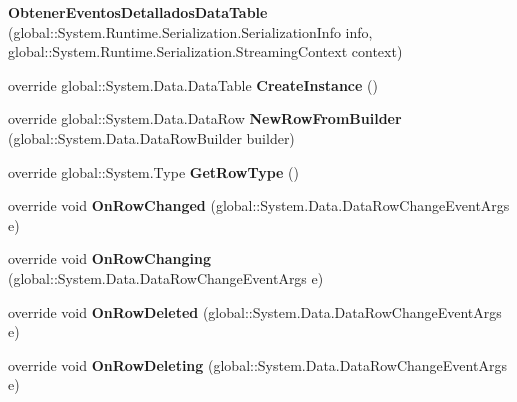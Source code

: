 \begin{DoxyCompactItemize}
\item 
{\bfseries Obtener\+Eventos\+Detallados\+Data\+Table} (global\+::\+System.\+Runtime.\+Serialization.\+Serialization\+Info info, global\+::\+System.\+Runtime.\+Serialization.\+Streaming\+Context context)\label{class_resa___pro_1_1_resa_d_b_data_set_1_1_obtener_eventos_detallados_data_table_a320b6ea974d03811f552e3c0265d36db}

\item 
override global\+::\+System.\+Data.\+Data\+Table {\bfseries Create\+Instance} ()\label{class_resa___pro_1_1_resa_d_b_data_set_1_1_obtener_eventos_detallados_data_table_a5c93b95c06c150a244fe0bd9e1ceda50}

\item 
override global\+::\+System.\+Data.\+Data\+Row {\bfseries New\+Row\+From\+Builder} (global\+::\+System.\+Data.\+Data\+Row\+Builder builder)\label{class_resa___pro_1_1_resa_d_b_data_set_1_1_obtener_eventos_detallados_data_table_a6ae84d0f806cc47a3a0301531ed5fe40}

\item 
override global\+::\+System.\+Type {\bfseries Get\+Row\+Type} ()\label{class_resa___pro_1_1_resa_d_b_data_set_1_1_obtener_eventos_detallados_data_table_ad0be6a841ce5a65c812e257559f02de5}

\item 
override void {\bfseries On\+Row\+Changed} (global\+::\+System.\+Data.\+Data\+Row\+Change\+Event\+Args e)\label{class_resa___pro_1_1_resa_d_b_data_set_1_1_obtener_eventos_detallados_data_table_a7eb0ac3d59cb0bf36824ff8c6212693e}

\item 
override void {\bfseries On\+Row\+Changing} (global\+::\+System.\+Data.\+Data\+Row\+Change\+Event\+Args e)\label{class_resa___pro_1_1_resa_d_b_data_set_1_1_obtener_eventos_detallados_data_table_a2e4ef5f806964ec503ffa37d6686837d}

\item 
override void {\bfseries On\+Row\+Deleted} (global\+::\+System.\+Data.\+Data\+Row\+Change\+Event\+Args e)\label{class_resa___pro_1_1_resa_d_b_data_set_1_1_obtener_eventos_detallados_data_table_a5b9414c74ff564eb62ae8ac7f2613748}

\item 
override void {\bfseries On\+Row\+Deleting} (global\+::\+System.\+Data.\+Data\+Row\+Change\+Event\+Args e)\label{class_resa___pro_1_1_resa_d_b_data_set_1_1_obtener_eventos_detallados_data_table_aa2c7757a15f0f56a701aeb4497b9b97f}

\end{DoxyCompactItemize}
